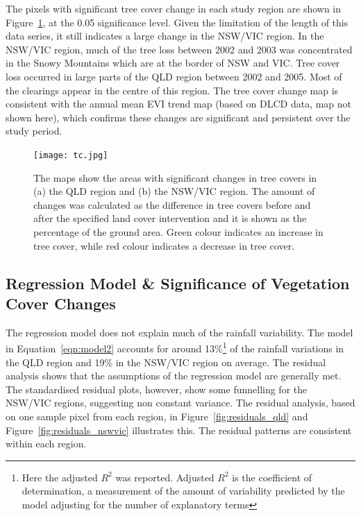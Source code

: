 \documentclass[draft,linenumbers]{agujournal}
\begin{document}
\begin{article}
The pixels with significant tree cover change in each study region are shown in Figure~\ref{fig:tc_trend}, at the 0.05 significance level. Given the limitation of the length of this data series, it still indicates a large change in the NSW/VIC region. In the NSW/VIC region, much of the tree loss between 2002 and 2003 was concentrated in the Snowy Mountains which are at the border of NSW and VIC. Tree cover loss occurred in large parts of the QLD region between 2002 and 2005. Most of the clearings appear in the centre of this region. The tree cover change map is consistent with the annual mean EVI trend map (based on DLCD data, map not shown here), which confirms these changes are significant and persistent over the study period. 

\begin{figure}[htp]
\centering
\texttt{[image: tc.jpg]}
  \caption{The maps show the areas with significant changes in tree covers in (a) the QLD region and (b) the NSW/VIC region. The amount of changes was calculated as the difference in tree covers before and after the specified land cover intervention and it is shown as the percentage of the ground area. Green colour indicates an increase in tree cover, while red colour indicates a decrease in tree cover. }
  \label{fig:tc_trend}
\end{figure}

\subsection{Regression Model \& Significance of Vegetation Cover Changes}

The regression model does not explain much of the rainfall variability. The model in Equation~\ref{eqn:model2} accounts for around 13\%\footnote{Here the adjusted $R^2$ was reported. Adjusted $R^2$ is the coefficient of determination, a measurement of the amount of variability predicted by the model adjusting for the number of explanatory terms} of the rainfall variations in the QLD region and 19\% in the NSW/VIC region on average. The residual analysis shows that the assumptions of the regression model are generally met. The standardised residual plots, however, show some funnelling for the NSW/VIC regions, suggesting non constant variance. The residual analysis, based on one sample pixel from each region, in Figure~\ref{fig:residuals_qld} and Figure~\ref{fig:residuals_nswvic} illustrates this. The residual patterns are consistent within each region.


\end{article}
\end{document}
